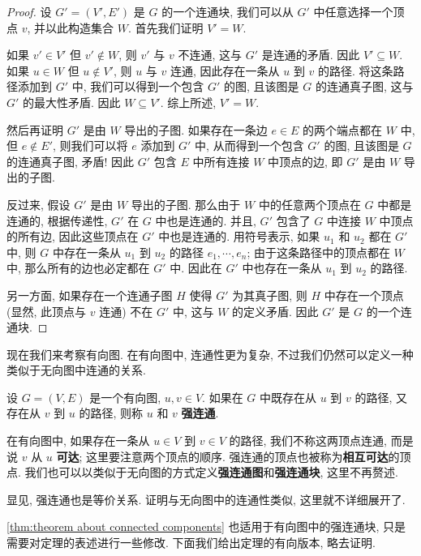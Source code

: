 \begin{proof}
    设 $G'=(V',E')$ 是 $G$ 的一个连通块, 我们可以从 $G'$ 中任意选择一个顶点 $v$, 并以此构造集合 $W$. 首先我们证明 $V'=W$.

    如果 $v'\in V'$ 但 $v'\not\in W$, 则 $v'$ 与 $v$ 不连通, 这与 $G'$ 是连通的矛盾. 因此 $V'\subseteq W$. 如果 $u\in W$ 但 $u\not\in V'$, 则 $u$ 与 $v$ 连通, 因此存在一条从 $u$ 到 $v$ 的路径. 将这条路径添加到 $G'$ 中, 我们可以得到一个包含 $G'$ 的图, 且该图是 $G$ 的连通真子图, 这与 $G'$ 的最大性矛盾. 因此 $W\subseteq V'$. 综上所述, $V'=W$.

    然后再证明 $G'$ 是由 $W$ 导出的子图. 如果存在一条边 $e\in E$ 的两个端点都在 $W$ 中, 但 $e\not\in E'$, 则我们可以将 $e$ 添加到 $G'$ 中, 从而得到一个包含 $G'$ 的图, 且该图是 $G$ 的连通真子图, 矛盾! 因此 $G'$ 包含 $E$ 中所有连接 $W$ 中顶点的边, 即 $G'$ 是由 $W$ 导出的子图. 

    反过来, 假设 $G'$ 是由 $W$ 导出的子图. 那么由于 $W$ 中的任意两个顶点在 $G$ 中都是连通的, 根据传递性, $G'$ 在 $G$ 中也是连通的. 并且, $G'$ 包含了 $G$ 中连接 $W$ 中顶点的所有边, 因此这些顶点在 $G'$ 中也是连通的. 用符号表示, 如果 $u_1$ 和 $u_2$ 都在 $G'$ 中, 则 $G$ 中存在一条从 $u_1$ 到 $u_2$ 的路径 $e_1,\cdots,e_n$; 由于这条路径中的顶点都在 $W$ 中, 那么所有的边也必定都在 $G'$ 中. 因此在 $G'$ 中也存在一条从 $u_1$ 到 $u_2$ 的路径.

    另一方面, 如果存在一个连通子图 $H$ 使得 $G'$ 为其真子图, 则 $H$ 中存在一个顶点 (显然, 此顶点与 $v$ 连通) 不在 $G'$ 中, 这与 $W$ 的定义矛盾. 因此 $G'$ 是 $G$ 的一个连通块.
\end{proof}

现在我们来考察有向图. 在有向图中, 连通性更为复杂, 不过我们仍然可以定义一种类似于无向图中连通的关系.

\begin{definition}[强连通]
    设 $G=(V,E)$ 是一个有向图, $u,v\in V$. 如果在 $G$ 中既存在从 $u$ 到 $v$ 的路径, 又存在从 $v$ 到 $u$ 的路径, 则称 $u$ 和 $v$ \textbf{强连通}.
\end{definition}

在有向图中, 如果存在一条从 $u\in V$ 到 $v\in V$ 的路径, 我们不称这两顶点连通, 而是说 $v$ 从 $u$ \textbf{可达}; 这里要注意两个顶点的顺序. 强连通的顶点也被称为\textbf{相互可达}的顶点. 我们也可以以类似于无向图的方式定义\textbf{强连通图}和\textbf{强连通块}, 这里不再赘述.

显见, 强连通也是等价关系. 证明与无向图中的连通性类似, 这里就不详细展开了.

\cref{thm:theorem about connected components} 也适用于有向图中的强连通块, 只是需要对定理的表述进行一些修改. 下面我们给出定理的有向版本, 略去证明.

